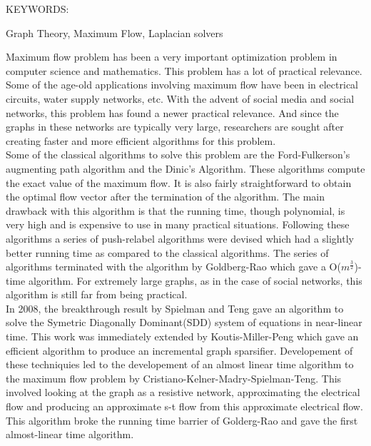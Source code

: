 \documentclass[BTech]{iitmdiss}
\begin{document}
\abstract

\noindent KEYWORDS: \hspace*{0.5em} \parbox[t]{4.4in}{Graph Theory,
Maximum Flow, Laplacian solvers }

\vspace*{24pt}

Maximum flow problem has been a very important optimization problem in computer science and mathematics. This problem has a lot of practical relevance.
Some of the age-old applications involving maximum flow have been in electrical circuits, water supply networks, etc. With the advent of social media
and social networks, this problem has found a newer practical relevance. And since the graphs in these networks are typically very large,
researchers are sought after creating faster and more efficient algorithms for this problem. \\

Some of the classical algorithms to solve this problem are the Ford-Fulkerson's augmenting path algorithm and the Dinic's Algorithm. These algorithms
compute the exact value of the maximum flow. It is also fairly straightforward to obtain the optimal flow vector after the termination of the
algorithm. The main drawback with this algorithm is that the running time, though polynomial, is very high and is expensive to use in many practical
situations. Following these algorithms a series of push-relabel algorithms were devised which had a slightly better running time as compared to the 
classical algorithms. The series of algorithms terminated with the algorithm by Goldberg-Rao which gave a O($m^{\frac{3}{2}}$)-time algorithm. For 
extremely large graphs, as in the case of social networks, this algorithm is still far from being practical. \\

In 2008, the breakthrough result by Spielman and Teng gave an algorithm to solve the Symetric Diagonally Dominant(SDD) system of equations in 
near-linear time. This work was immediately extended by Koutis-Miller-Peng which gave an efficient algorithm to produce an incremental graph sparsifier.
Developement of these techniquies led to the developement of an almost linear time algorithm to the maximum flow problem by Cristiano-Kelner-Madry-Spielman-Teng.
This involved looking at the graph as a resistive network, approximating the electrical flow and producing an approximate s-t flow from this approximate
electrical flow. This algorithm broke the running time barrier of Golderg-Rao and gave the first almost-linear time algorithm. \\
\end{document}
